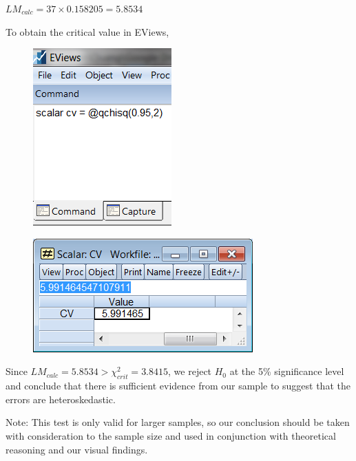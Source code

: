 \documentclass[12pt]{report}
\begin{document}
\centering $LM_{calc} = 37 \times 0.158205 = 5.8534$ 

\justify \noindent To obtain the critical value in EViews,
\begin{figure}[H]
	\centering
	\includegraphics{tute10_2}
\end{figure}
\vspace{-\baselineskip}
\begin{figure}[H]
	\centering
	\includegraphics{tute10_3}
\end{figure}
\vspace{-\baselineskip}

\noindent Since $LM_{calc} = 5.8534 > \chi^2_{crit} = 3.8415$, we reject $H_0$ at the 5\% significance level and conclude that there is sufficient evidence from our sample to suggest that the errors are heteroskedastic.

\noindent Note: This test is only valid for larger samples, so our conclusion should be taken with consideration to the sample size and used in conjunction with theoretical reasoning and our visual findings. 
\end{document}
